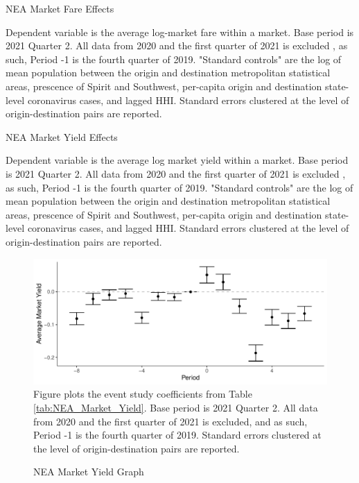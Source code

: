 \documentclass{article}
\begin{document}
\begin{appendices}
	\begin{table}
		\caption{NEA Market Fare Effects}
		\label{tab:NEA_Market_Fare}
		
		\footnotesize{Dependent variable is the average log-market fare within a market. Base period is 2021 Quarter 2. All data from 2020 and the first quarter of 2021 is excluded , as such,  Period -1 is the fourth quarter of 2019. "Standard controls" are the log of mean population between the origin and destination metropolitan statistical areas, prescence of Spirit and Southwest, per-capita origin and destination state-level coronavirus cases, and lagged HHI. Standard errors clustered at the level of origin-destination pairs are reported.  }
	\end{table}
	
	
	
	\begin{table}
		\caption{NEA Market Yield Effects}
		\label{tab:NEA_Market_Yield}
		
		\footnotesize{Dependent variable is the average log market yield within a market. Base period is 2021 Quarter 2. All data from 2020 and the first quarter of 2021 is excluded , as such,  Period -1 is the fourth quarter of 2019. "Standard controls" are the log of mean population between the origin and destination metropolitan statistical areas, prescence of Spirit and Southwest, per-capita origin and destination state-level coronavirus cases, and lagged HHI. Standard errors clustered at the level of origin-destination pairs are reported.  }
	\end{table}
	
	\begin{figure}
		\caption{NEA Market Yield Graph}
		\label{fig:NEA_Market_Yield}
		\includegraphics[width = \linewidth]{NEA_Market_Yield_Graph.pdf}
		\footnotesize{Figure plots the event study coefficients from Table \ref{tab:NEA_Market_Yield}. Base period is 2021 Quarter 2. All data from 2020 and the first quarter of 2021 is excluded, and as such, Period -1 is the fourth quarter of 2019. Standard errors clustered at the level of origin-destination pairs are reported. }
	\end{figure}
	

\end{appendices}
\end{document}
